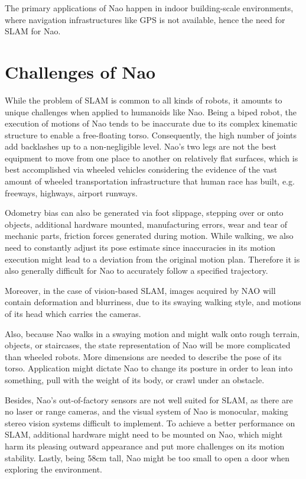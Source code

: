 \documentclass[11pt]{amsart}
\begin{document}
The primary applications of Nao happen in indoor building-scale environments, where navigation infrastructures like GPS is not available, hence the need for SLAM for Nao.

\section{Challenges of Nao}

While the problem of SLAM is common to all kinds of robots, it amounts to unique challenges when applied to humanoids like Nao. Being a biped robot, the execution of motions of Nao tends to be inaccurate due to its complex kinematic structure to enable a free-floating torso. Consequently, the high number of joints add backlashes up to a non-negligible level. Nao's two legs are not the best equipment to move from one place to another on relatively flat surfaces, which is best accomplished via wheeled vehicles considering the evidence of the vast amount of wheeled transportation infrastructure that human race has built, e.g. freeways, highways, airport runways.

Odometry bias can also be generated via foot slippage, stepping over or onto objects, additional hardware mounted, manufacturing errors, wear and tear of mechanic parts, friction forces generated during motion. While walking, we also need to constantly adjust its pose estimate since inaccuracies in its motion execution might lead to a deviation from the original motion plan. Therefore it is also generally difficult for Nao to accurately follow a specified trajectory.

Moreover, in the case of vision-based SLAM, images acquired by NAO will contain deformation and blurriness, due to its swaying walking style, and motions of its head which carries the cameras.

Also, because Nao walks in a swaying motion and might walk onto rough terrain, objects, or staircases, the state representation of Nao will be more complicated than wheeled robots. More dimensions are needed to describe the pose of its torso. Application might dictate Nao to change its posture in order to lean into something, pull with the weight of its body, or crawl under an obstacle.

Besides, Nao's out-of-factory sensors are not well suited for SLAM, as there are no laser or range cameras, and the visual system of Nao is monocular, making stereo vision systems difficult to implement. To achieve a better performance on SLAM, additional hardware might need to be mounted on Nao, which might harm its pleasing outward appearance and put more challenges on its motion stability. Lastly, being 58cm tall, Nao might be too small to open a door when exploring the environment.
\end{document}
